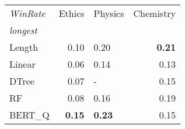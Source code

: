 \begin{tabular}{lrlr}
\toprule
\textit{WinRate} &  Ethics & Physics &  Chemistry \\
\textit{longest}  &         &         &            \\
\midrule
Length &    0.10 &     0.20 &       \textbf{0.21} \\
Linear &    0.06 &    0.14 &       0.13 \\
DTree  &    0.07 &       - &       0.15 \\
RF     &    0.08 &    0.16 &       0.19 \\
BERT\_Q &    \textbf{0.15} &    \textbf{0.23} &       0.15 \\
\bottomrule
\end{tabular}
